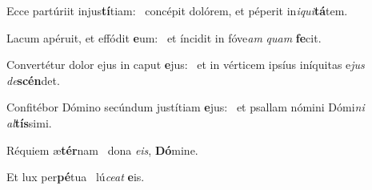 \item Ecce partúriit injus\textbf{tí}tiam:~\psstar{} concépit dolórem, et péperit in\textit{iqui}\textbf{tá}tem.

\item Lacum apéruit, et effódit \textbf{e}um:~\psstar{} et íncidit in fóve\textit{am} \textit{quam} \textbf{fe}cit.

\item Convertétur dolor ejus in caput \textbf{e}jus:~\psstar{} et in vérticem ipsíus iníquitas e\textit{jus} \textit{de}\textbf{scén}det.

\item Confitébor Dómino secúndum justítiam \textbf{e}jus:~\psstar{} et psallam nómini Dómi\textit{ni} \textit{al}\textbf{tís}simi.

\item Réquiem æ\textbf{tér}nam~\psstar{} dona \textit{eis}, \textbf{Dó}mine.

\item Et lux per\textbf{pé}tua~\psstar{} lú\textit{ceat} \textbf{e}is.